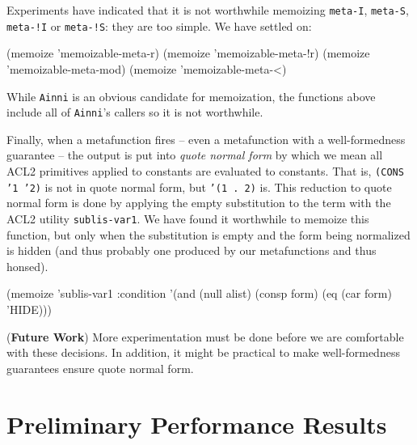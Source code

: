 \documentclass[submission,copyright,creativecommons]{eptcs}
\newcommand{\ptt}[1]{\tt{#1}}
\begin{document}
Experiments have indicated that it is not worthwhile memoizing
{\ptt{meta-I}}, {\ptt{meta-S}}, {\ptt{meta-!I}} or {\ptt{meta-!S}}: they are
too simple.  We have settled on:

\begin{acl2p}
(memoize 'memoizable-meta-r)
(memoize 'memoizable-meta-!r)
(memoize 'memoizable-meta-mod)
(memoize 'memoizable-meta-<)
\end{acl2p}

While {\ptt{Ainni}} is an obvious candidate for memoization, the functions
above include all of {\ptt{Ainni}}'s callers so it is not worthwhile.

Finally, when a metafunction fires -- even a metafunction with a
well-formedness guarantee -- the output is put into {\em{quote normal form}}
by which we mean all ACL2 primitives applied to constants are evaluated to
constants.  That is, {\ptt{(CONS '1 '2)}} is not in quote normal form, but
{\ptt{'(1 . 2)}} is.  This reduction to quote normal form is done by applying
the empty substitution to the term with the ACL2 utility {\ptt{sublis-var1}}.
We have found it worthwhile to memoize this function, but only when the
substitution is empty and the form being normalized is hidden (and thus
probably one produced by our metafunctions and thus honsed).

\begin{acl2p}
(memoize 'sublis-var1
         :condition '(and (null alist)
                          (consp form)
                          (eq (car form) 'HIDE)))
\end{acl2p}

({\bf{Future Work}})  More experimentation must be done before we are
comfortable with these decisions.  In addition, it might be practical to
make well-formedness guarantees ensure quote normal form.

\section{Preliminary Performance Results}
\end{document}
